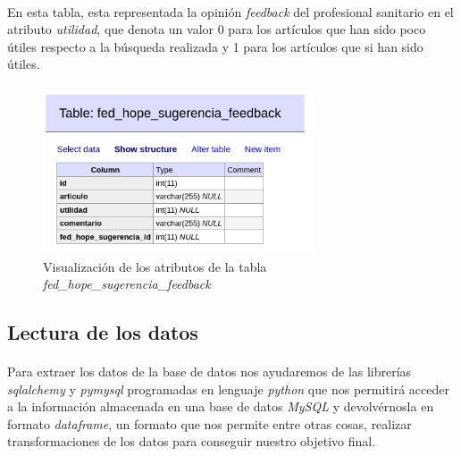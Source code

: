 \documentclass[10pt,a4paper,oneside]{book}
\begin{document}
\paragraph{}
En esta tabla, esta representada la opinión \textit{feedback} del profesional sanitario en el atributo \textit{utilidad}, que denota un valor 0 para los artículos que han sido poco útiles respecto a la búsqueda realizada y 1 para los artículos que si han sido útiles.

\paragraph{}
\begin{figure}[!htb]
  \centering
    \includegraphics[width=8cm]{images/metodologia_tabla_fed_hope_sugerencia_feedback.png}
    \caption{Visualización de los atributos de la tabla \textit{fed\_hope\_sugerencia\_feedback}}
  \label{tablaFedHopeSugerenciaFeedback}
\end{figure}

\paragraph{}


\newpage
\subsection{Lectura de los datos}

\paragraph{}
Para extraer los datos de la base de datos nos ayudaremos de las librerías \textit{sqlalchemy} y \textit{pymysql} programadas en lenguaje \textit{python} que nos permitirá acceder a la información almacenada en una base de datos \textit{MySQL} y devolvérnosla en formato \textit{dataframe}, un formato que nos permite entre otras cosas, realizar transformaciones de los datos para conseguir nuestro objetivo final.
\end{document}
